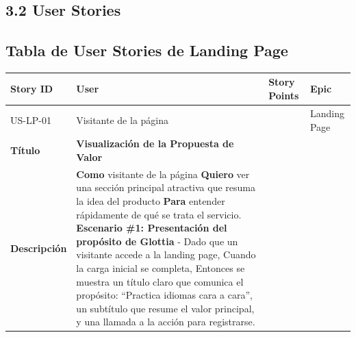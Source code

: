 \subsection{3.2 User
Stories}\label{report__30-cap3-requirements-spec.md__user-stories}

\subsection{Tabla de User Stories de Landing
Page}\label{report__30-cap3-requirements-spec.md__tabla-de-user-stories-de-landing-page}

{\def\LTcaptype{none} %
\begin{longtable}[]{@{}
  >{\raggedright\arraybackslash}p{}
  >{\raggedright\arraybackslash}p{}
  >{\raggedright\arraybackslash}p{}
  >{\raggedright\arraybackslash}p{}@{}}
\toprule\noalign{}
\begin{minipage}[b]{\linewidth}\raggedright
Story ID
\end{minipage} & \begin{minipage}[b]{\linewidth}\raggedright
User
\end{minipage} & \begin{minipage}[b]{\linewidth}\raggedright
Story Points
\end{minipage} & \begin{minipage}[b]{\linewidth}\raggedright
Epic
\end{minipage} \\
\midrule\noalign{}
\endhead
\bottomrule\noalign{}
\endlastfoot
US-LP-01 & Visitante de la página & 3 & Landing Page \\
\textbf{Título} & \textbf{Visualización de la Propuesta de Valor} & & \\
\textbf{Descripción} & \textbf{Como} visitante de la página
\textbf{Quiero} ver una sección principal atractiva que resuma la idea
del producto \textbf{Para} entender rápidamente de qué se trata el
servicio. \textbf{Escenario \#1: Presentación del propósito de Glottia}
- Dado que un visitante accede a la landing page, Cuando la carga
inicial se completa, Entonces se muestra un título claro que comunica el
propósito: ``Practica idiomas cara a cara'', un subtítulo que resume el
valor principal, y una llamada a la acción para registrarse. & & \\
\end{longtable}
}

